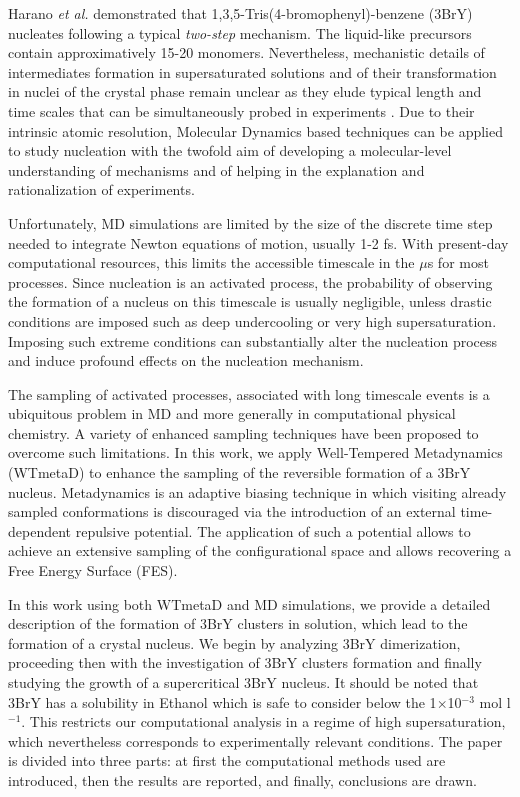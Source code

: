 \documentclass[journal=cgdefu,manuscript=article,layout=twocolumn]{achemso}
\begin{document}
Harano \emph{et al.} demonstrated that 1,3,5-Tris(4-bromophenyl)-benzene (3BrY) nucleates following a typical \emph{two-step} mechanism. The liquid-like precursors~\cite{harano2012heterogeneous} contain approximatively 15-20 monomers. Nevertheless, mechanistic details of intermediates formation in supersaturated solutions and of their transformation in nuclei of the crystal phase remain unclear as they elude typical length and time scales that can be simultaneously probed in experiments \cite{vekilov2012crystal}. 
Due to their intrinsic atomic resolution, Molecular Dynamics based techniques can be applied to study nucleation with the twofold aim of developing a molecular-level understanding of mechanisms and of helping in the explanation and rationalization of experiments. 

Unfortunately, MD simulations are limited by the size of the discrete time step needed to integrate Newton equations of motion, usually 1-2 fs. With present-day computational resources, this limits the accessible timescale in the $\mu$s for most processes. 
Since nucleation is an activated process, the probability of observing the formation of a nucleus on this timescale is usually negligible, unless drastic conditions are imposed such as deep undercooling or very high supersaturation\cite{ten1996numerical,trudu2006freezing}. Imposing such extreme conditions can substantially alter the nucleation process and induce profound effects on the nucleation mechanism\cite{trudu2006freezing}. 

The sampling of activated processes, associated with long timescale events is a ubiquitous problem in MD and more generally in computational physical chemistry. A variety of  enhanced sampling techniques have been proposed to overcome such 
limitations\cite{huber1994local,torrie1977nonphysical,laio2002escaping,dellago2002transition}. 
In this work, we apply Well-Tempered Metadynamics (WTmetaD) \cite{Barducci2008} to enhance the sampling of the reversible formation of a 3BrY nucleus. Metadynamics is an adaptive biasing technique in which visiting already sampled conformations is discouraged via the introduction of an external time-dependent repulsive potential. 
The application of such a potential allows to achieve an extensive sampling of the configurational space and allows recovering a Free Energy Surface (FES)\cite{barducci2011metadynamics,giberti2015metadynamics}. 

In this work using both WTmetaD and MD simulations, we provide a detailed description of the formation of 3BrY clusters in solution, which lead to the formation of a crystal nucleus. We begin by analyzing 3BrY dimerization, proceeding then with the investigation of 3BrY clusters formation and finally studying the growth of a supercritical 3BrY nucleus. It should be noted that 3BrY has a solubility in Ethanol which is safe to consider below the 1$\times$10$^{-3}$ mol l$^{-1}$. This restricts our computational analysis in a regime of high supersaturation, which nevertheless corresponds to experimentally relevant conditions. The paper is divided into three parts: at first the computational methods used are introduced, then the results are reported, and finally, conclusions are drawn.
\end{document}
